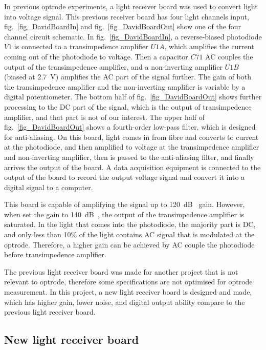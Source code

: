 In previous optrode experiments, a light receiver board was used to convert light into voltage signal.  This previous receiver board has four light channels input, fig.~\ref{fig_DavidBoardIn} and fig.~\ref{fig_DavidBoardOut} show one of the four channel circuit schematic.  In fig.~\ref{fig_DavidBoardIn}, a reverse-biased photodiode $V1$ is connected to a transimpedence amplifier $U1A$, which amplifies the current coming out of the photodiode to voltage.  Then a capacitor $C71$ AC couples the output of the transimpedence amplifier, and a non-inverting amplifier $U1B$ (biased at \qty{2.7}{V}) amplifies the AC part of the signal further.  The gain of both the transimpedence amplifier and the non-inverting amplifier is variable by a digital potentiometer.  The bottom half of fig.~\ref{fig_DavidBoardOut} shows further processing to the DC part of the signal, which is the output of transimpedence amplifier, and that part is not of our interest.  The upper half of fig.~\ref{fig_DavidBoardOut} shows a fourth-order low-pass filter, which is designed for anti-aliasing.  On this board, light comes in from fibre and converts to current at the photodiode, and then amplified to voltage at the transimpedence amplifier and non-inverting amplifier, then is passed to the anti-aliasing filter, and finally arrives the output of the board.  A data acquisition equipment is connected to the output of the board to record the output voltage signal and convert it into a digital signal to a computer.

This board is capable of amplifying the signal up to \qty{120}{dB\Omega} gain.  However, when set the gain to \qty{140}{dB\Omega}, the output of the transimpedence amplifier is saturated.  In the light that comes into the photodiode, the majority part is DC, and only less than 10\% of the light contains AC signal that is modulated at the optrode.  Therefore, a higher gain can be achieved by AC couple the photodiode before transimpedence amplifier.

The previous light receiver board was made for another project that is not relevant to optrode, therefore some specifications are not optimised for optrode measurement.  In this project, a new light receiver board is designed and made, which has higher gain, lower noise, and digital output ability compare to the previous light receiver board.

\subsection{New light receiver board}

